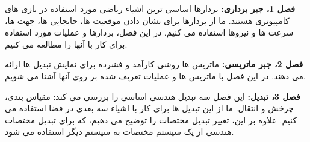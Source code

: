 {\begin{spacing}{1.4}
        \textbf{فصل 1، جبر برداری:} بردارها اساسی ترین اشیاء ریاضی مورد استفاده در بازی های کامپیوتری هستند.
        ما از بردارها برای نشان دادن موقعیت ها، جابجایی ها، جهت ها، سرعت ها و نیروها استفاده می کنیم.
        در این فصل، بردارها و عملیات مورد استفاده برای کار با آنها را مطالعه می کنیم.

        \textbf{فصل 2، جبر ماتریسی:} ماتریس ها روشی کارآمد و فشرده برای نمایش تبدیل ها ارائه می دهند.
        در این فصل با ماتریس ها و عملیات تعریف شده بر روی آنها آشنا می شویم.

        \textbf{فصل 3، تبدیل:} این فصل سه تبدیل هندسی اساسی را بررسی می کند: مقیاس بندی، چرخش و انتقال.
        ما از این تبدیل ها برای کار با اشیاء سه بعدی در فضا استفاده می کنیم.
        علاوه بر این، تغییر تبدیل مختصات را توضیح می دهیم، که برای تبدیل مختصات هندسی از یک سیستم مختصات به سیستم دیگر استفاده می شود.
    \end{spacing}
}

\setcounter{chapter}{1}


